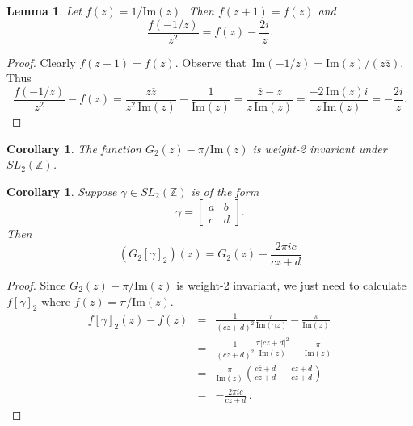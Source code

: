 \documentclass {amsart}
\theoremstyle{plain}
\newtheorem{corollary}[proposition]{Corollary}
\newtheorem{lemma}[proposition]{Lemma}
\theoremstyle{definition}
\theoremstyle{remark}
\newcommand{\bZ}{{\mathbb{Z}}}
\begin{document}
\begin{lemma}
Let
$
f(z) = 1 / \mathrm{Im}(z)
$.
Then $f(z + 1) = f(z)$ and
$$
\frac{f(-1/z)}{z^2} = f(z) - \frac{2 i}{z}.
$$
\end{lemma}

\begin{proof}
Clearly $f(z+1) = f(z)$. 
Observe that~$\mathrm{Im} (-1/z) = \mathrm{Im}(z) / (z \overline z)$. Thus
$$
\frac{f(-1/z)}{z^2} - f(z)  = \frac{z \overline z} { z^2 \, \mathrm{Im} (z)} - \frac{1}{\mathrm{Im}(z)}
=
\frac{\overline z - z} {z \, \mathrm{Im} (z)}
=
\frac{-\mathrm{2\,  Im}(z) i} {z \, \mathrm{Im} (z)}
=
- \frac{2 i}{z}.
$$
\end{proof}

\begin{corollary}
The function $G_2(z) -  \pi / \mathrm{Im} (z)$ is weight-2 invariant under $SL_2(\bZ)$.
\end{corollary}

\begin{corollary}
Suppose $\gamma  \in SL_2(\bZ)$ is of the form
$$\gamma = \begin{bmatrix}
a & b \\
c & d
\end{bmatrix}.$$
Then
$$
\left( G_2  {[\gamma]_2} \right) (z) =  G_2 (z) - \frac{2 \pi i c }{c z + d}
$$
\end{corollary}

\begin{proof}
Since $G_2(z) -  \pi / \mathrm{Im} (z)$ is weight-2 invariant, we just need
to calculate $f [\gamma]_2$ where $f(z) = \pi/\mathrm{Im}(z)$.
\begin{eqnarray*}
f [\gamma]_2 (z) - f (z)
&=&
\frac{1}{(c z + d)^2} \frac{\pi}{\mathrm{Im}(\gamma z)} - \frac{\pi}{\mathrm{Im}(z)}
\\
&=&
\frac{1}{(c z + d)^2} \frac{\pi |c z + d|^2}{\mathrm{Im}(z)} - \frac{\pi}{\mathrm{Im}(z)}
 \\
&=&
\frac{\pi}{\mathrm{Im}(z)}
\left(
 \frac{c\overline z + d} {cz+d} -  \frac{cz + d} {cz+d} 
 \right)
 \\
 &=&
 - \frac{2 \pi i c}{c z + d} \, .
\end{eqnarray*}

\end{proof}
\end{document}
